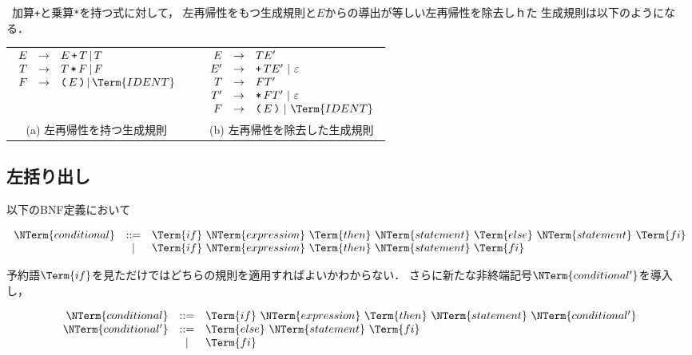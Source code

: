 \documentclass[a4j,dvipdfmx]{jbook}
\begin{document}
\begin{Exmp}\ 加算\texttt{+}と乗算\texttt{*}を持つ式に対して，
  左再帰性をもつ生成規則と$E$からの導出が等しい左再帰性を除去しｈた
  生成規則は以下のようになる．
  \begin{center}
  \begin{tabular}{ccc}
    $\begin{array}{rcl}
      E & \rightarrow & E\,\texttt{+}\,T\,|\,T\\
      T & \rightarrow & T\,\texttt{*}\,F\,|\,F\\
      F & \rightarrow & \texttt{(}\,E\,\texttt{)}\,|\,\Term{IDENT}
    \end{array}$
    & &
    $\begin{array}{rcl}
      E & \rightarrow & TE'\\
      E'& \rightarrow & \texttt{+}\,TE'\ |\ \varepsilon\\
      T & \rightarrow & FT'\\
      T'& \rightarrow & \texttt{*}\,FT'\ |\ \varepsilon\\
      F & \rightarrow & \texttt{(}\,E\,\texttt{)}\ |\ \Term{IDENT}
    \end{array}$\\
     (a) 左再帰性を持つ生成規則 & & (b) 左再帰性を除去した生成規則
  \end{tabular}
\end{center}
\end{Exmp}

\subsection{左括り出し}

以下のBNF定義において

\[\begin{array}{rcl}
  \NTerm{conditional} & \mathtt{::=} & \Term{if}\ \NTerm{expression}\ \Term{then}\ \NTerm{statement}\ \Term{else}\ \NTerm{statement}\ \Term{fi}\\
  & | & \Term{if}\ \NTerm{expression}\ \Term{then}\ \NTerm{statement}\ \Term{fi}
\end{array}\]

予約語$\Term{if}$を見ただけではどちらの規則を適用すればよいかわからない．
さらに新たな非終端記号$\NTerm{conditional'}$を導入し，

\[\begin{array}{rcl}
  \NTerm{conditional} & \mathtt{::=} & \Term{if}\ \NTerm{expression}\ \Term{then}\ \NTerm{statement}\ \NTerm{conditional'}\\
  \NTerm{conditional'}& \mathtt{::=} & \Term{else}\ \NTerm{statement}\ \Term{fi}\\
  & | & \Term{fi}
\end{array}\]
\end{document}
